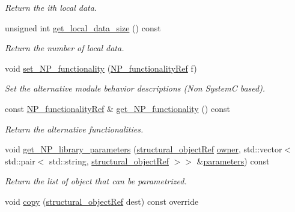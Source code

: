 \begin{DoxyCompactItemize}
\begin{DoxyCompactList}\small\item\em Return the ith local data. \end{DoxyCompactList}\item 
unsigned int \hyperlink{classmodule_a07738280ce95e0a18d01510929d46a83}{get\+\_\+local\+\_\+data\+\_\+size} () const
\begin{DoxyCompactList}\small\item\em Return the number of local data. \end{DoxyCompactList}\item 
void \hyperlink{classmodule_a50873fd8528c6a212048c39e6578c9bd}{set\+\_\+\+N\+P\+\_\+functionality} (\hyperlink{NP__functionality_8hpp_aacd74315d343c1054cd3c01e18627049}{N\+P\+\_\+functionality\+Ref} f)
\begin{DoxyCompactList}\small\item\em Set the alternative module behavior descriptions (Non SystemC based). \end{DoxyCompactList}\item 
const \hyperlink{NP__functionality_8hpp_aacd74315d343c1054cd3c01e18627049}{N\+P\+\_\+functionality\+Ref} \& \hyperlink{classmodule_a9238b0f905edbc784f531f78cf2a78b0}{get\+\_\+\+N\+P\+\_\+functionality} () const
\begin{DoxyCompactList}\small\item\em Return the alternative functionalities. \end{DoxyCompactList}\item 
void \hyperlink{classmodule_aaa6bacd38ef58c41946a993dde301cfc}{get\+\_\+\+N\+P\+\_\+library\+\_\+parameters} (\hyperlink{structural__objects_8hpp_a8ea5f8cc50ab8f4c31e2751074ff60b2}{structural\+\_\+object\+Ref} \hyperlink{classstructural__object_a3e96b3e00b8a78adfc44872d82e186ea}{owner}, std\+::vector$<$ std\+::pair$<$ std\+::string, \hyperlink{structural__objects_8hpp_a8ea5f8cc50ab8f4c31e2751074ff60b2}{structural\+\_\+object\+Ref} $>$$>$ \&\hyperlink{classstructural__object_ab665280607e11d5ae406f1760ebc9881}{parameters}) const
\begin{DoxyCompactList}\small\item\em Return the list of object that can be parametrized. \end{DoxyCompactList}\item 
void \hyperlink{classmodule_ac19167af53d30fe69ccc16881cd61425}{copy} (\hyperlink{structural__objects_8hpp_a8ea5f8cc50ab8f4c31e2751074ff60b2}{structural\+\_\+object\+Ref} dest) const override
$$
\end{DoxyCompactItemize}
